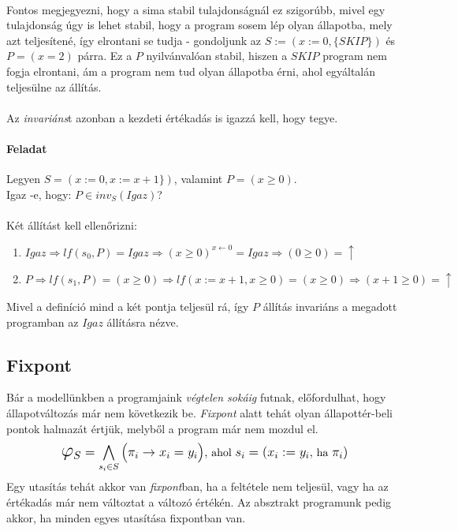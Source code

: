 \documentclass[12pt]{article}
\begin{document}
	\paragraph{}
	Fontos megjegyezni, hogy a sima stabil tulajdonságnál ez szigorúbb, mivel egy tulajdonság úgy is lehet stabil, hogy a program sosem lép olyan állapotba, mely azt teljesítené, így elrontani se tudja - gondoljunk az $S := (x:=0, \{SKIP\})$ és $P=(x=2)$ párra. Ez a $P$ nyilvánvalóan stabil, hiszen a $SKIP$ program nem fogja elrontani, ám a program nem tud olyan állapotba érni, ahol egyáltalán teljesülne az állítás.
	\paragraph{}Az \textit{invariáns}t azonban a kezdeti értékadás is igazzá kell, hogy tegye.
	
	\paragraph{Feladat}
	Legyen $ S = (x:=0,x := x+1 \})$, valamint $P = (x\ge0)$.\\
	Igaz -e, hogy: $P \in inv_S(Igaz)$?
	\paragraph{}
	Két állítást kell ellenőrizni:
	\begin{enumerate}
		\item $Igaz \Rightarrow lf(s_0, P) = Igaz \Rightarrow (x\ge0)^{x\leftarrow 0}= Igaz \Rightarrow (0\ge0) = \uparrow$
		\item $ P \Rightarrow lf(s_1, P) = (x\ge0) \Rightarrow lf(x:=x+1, x\ge0) = (x\ge0) \Rightarrow (x+1\ge 0) = \uparrow$
	\end{enumerate}
	
	Mivel a definíció mind a két pontja teljesül rá, így $P$ állítás invariáns a megadott programban az $Igaz$ állításra nézve.
	
	\subsection{Fixpont}
	Bár a modellünkben a programjaink \textit{végtelen sokáig} futnak, előfordulhat, hogy állapotváltozás már nem következik be. \textit{Fixpont} alatt tehát olyan állapottér-beli pontok halmazát értjük, melyből a program már nem mozdul el. 
	$$\mathlarger{\mathlarger{\mathlarger{\varphi}}_S =\bigwedge_{s_i  \in S} \big( \pi_i \rightarrow x_i = y_i \big),} \text{ ahol } \mathlarger{s_i = (x_i := y_i, }\text{ ha }\mathlarger{ \pi_i)}$$
	Egy utasítás tehát akkor van \textit{fixpont}ban, ha a feltétele nem teljesül, vagy ha az értékadás már nem változtat a változó értékén. Az absztrakt programunk pedig akkor, ha minden egyes utasítása fixpontban van.
	
\end{document}
